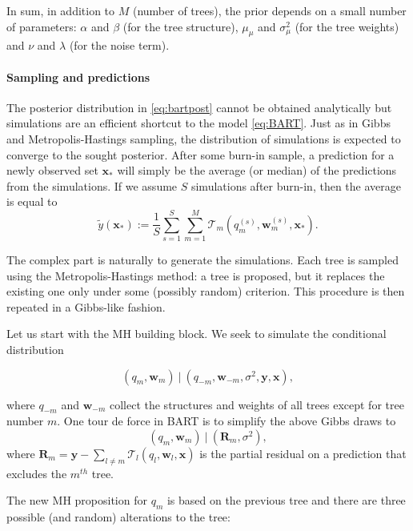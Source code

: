 In sum, in addition to $M$ (number of trees), the prior depends on a small number of parameters: $\alpha$ and $\beta$ (for the tree structure), $\mu_\mu$ and $\sigma_\mu^2$ (for the tree weights) and $\nu$ and $\lambda$ (for the noise term).

\paragraph{Sampling and predictions}

The posterior distribution in \ref{eq:bartpost} cannot be obtained analytically but simulations are an efficient shortcut to the model \ref{eq:BART}. Just as in Gibbs and Metropolis-Hastings sampling, the distribution of simulations is expected to converge to the sought posterior. After some burn-in sample, a prediction for a newly observed set $\textbf{x}_*$ will simply be the average (or median) of the predictions from the simulations. If we assume $S$ simulations after burn-in, then the average is equal to
\begin{equation}
\tilde{y}(\textbf{x}_*):=\frac{1}{S}\sum_{s=1}^S\sum_{m=1}^M\mathcal{T}_m\left(q_m^{(s)},\textbf{w}_m^{(s)}, \textbf{x}_*\right).
\end{equation}

The complex part is naturally to generate the simulations. Each tree is sampled using the Metropolis-Hastings method: a tree is proposed, but it replaces the existing one only under some (possibly random) criterion. This procedure is then repeated in a Gibbs-like fashion.

Let us start with the MH building block. We seek to simulate the conditional distribution

\begin{equation}
(q_m,\textbf{w}_m) \ | \ (q_{-m},\textbf{w}_{-m},\sigma^2, \textbf{y}, \textbf{x}),
\end{equation}

where $q_{ -m}$ and $\textbf{w}_{ -m}$ collect the structures and weights of all trees except for tree number $m$. One tour de force in BART is to simplify the above Gibbs draws to
\begin{equation}
(q_m,\textbf{w}_m) \ | \ (\textbf{R}_{m},\sigma^2 ),
\end{equation}
where $\textbf{R}_{m}=\textbf{y} -\sum_{l \neq m}\mathcal{T}_l(q_l,\textbf{w}_l, \textbf{x})$ is the partial residual on a prediction that excludes the $m^{th}$ tree.

The new MH proposition for $q_m$ is based on the previous tree and there are three possible (and random) alterations to the tree:

